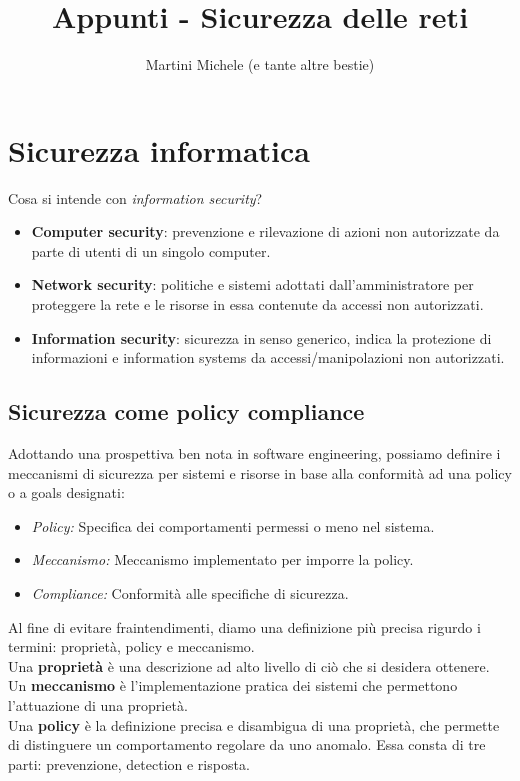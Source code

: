 \documentclass[a4paper, 11pt, notitlepage, fleqn]{report}
\title{Appunti - Sicurezza delle reti}
\author{Martini Michele {\footnotesize (e tante altre bestie)}}
\begin{document}
\maketitle

\chapter{Sicurezza informatica}
Cosa si intende con \emph{information security}?
\begin{itemize}
	\item \textbf{Computer security}: prevenzione e rilevazione di azioni non autorizzate da parte di utenti di un singolo computer.
	\item \textbf{Network security}: politiche e sistemi adottati dall'amministratore per proteggere la rete e le risorse in essa contenute da accessi non autorizzati.
	\item \textbf{Information security}: sicurezza in senso generico, indica la protezione di informazioni e information systems da accessi/manipolazioni non autorizzati.
\end{itemize}

\section{Sicurezza come policy compliance}
Adottando una prospettiva ben nota in software engineering, possiamo definire i meccanismi di sicurezza per sistemi e risorse in base alla conformità ad una policy o a goals designati:
\begin{itemize}[itemsep=0pt, topsep=6pt]
	\item \emph{Policy:} Specifica dei comportamenti permessi o meno nel sistema.
	\item \emph{Meccanismo:} Meccanismo implementato per imporre la policy.
	\item \emph{Compliance:} Conformità alle specifiche di sicurezza.
\end{itemize}
Al fine di evitare fraintendimenti, diamo una definizione più precisa rigurdo i termini: proprietà, policy e meccanismo.\\
Una \textbf{proprietà} è una descrizione ad alto livello di ciò che si desidera ottenere.\\
Un \textbf{meccanismo} è l'implementazione pratica dei sistemi che permettono l'attuazione di una proprietà.\\
Una \textbf{policy} è la definizione precisa e disambigua di una proprietà, che permette di distinguere un comportamento regolare da uno anomalo. Essa consta di tre parti: prevenzione, detection e risposta.
\end{document}
